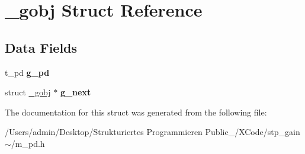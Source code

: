 \hypertarget{struct__gobj}{}\section{\+\_\+gobj Struct Reference}
\label{struct__gobj}
\subsection*{Data Fields}
\begin{DoxyCompactItemize}
\item 
\mbox{\label{struct__gobj_aeb4882e0afbd07827beea5cb2024b4ac}} 
t\+\_\+pd {\bfseries g\+\_\+pd}
\item 
\mbox{\label{struct__gobj_abb00f331d612607d8138bd9a750c1e2f}} 
struct \hyperlink{struct__gobj}{\+\_\+gobj} $\ast$ {\bfseries g\+\_\+next}
\end{DoxyCompactItemize}


The documentation for this struct was generated from the following file\+:\begin{DoxyCompactItemize}
\item 
/\+Users/admin/\+Desktop/\+Strukturiertes Programmieren Public\+\_/\+X\+Code/stp\+\_\+gain$\sim$/m\+\_\+pd.\+h\end{DoxyCompactItemize}
